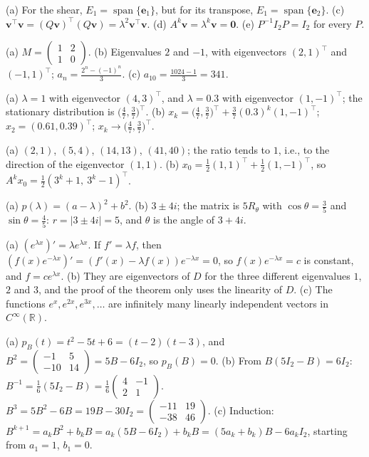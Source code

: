 \documentclass[11pt]{article}
\DeclareMathOperator{\Span}{span}
\begin{document}
\begin{description}[leftmargin=0pt, itemsep=0.3em]
    \item[\ref{pr:eig-props}.] (a) For the shear, $E_1 = \Span\{\mathbf{e}_1\}$, but for its transpose, $E_1 = \Span\{\mathbf{e}_2\}$. (c) $\mathbf{v}^\top \mathbf{v} = (Q\mathbf{v})^\top(Q\mathbf{v}) = \lambda^2 \mathbf{v}^\top \mathbf{v}$. (d) $A^k \mathbf{v} = \lambda^k \mathbf{v} = \mathbf{0}$. (e) $P^{-1} I_2 P = I_2$ for every $P$.
    \item[\ref{pr:eig-recurrence}.] (a) $M = \begin{pmatrix} 1 & 2 \\ 1 & 0 \end{pmatrix}$. (b) Eigenvalues $2$ and $-1$, with eigenvectors $(2, 1)^\top$ and $(-1, 1)^\top$; $a_n = \frac{2^n - (-1)^n}{3}$. (c) $a_{10} = \frac{1024 - 1}{3} = 341$.
    \item[\ref{pr:eig-markov}.] (a) $\lambda = 1$ with eigenvector $(4, 3)^\top$, and $\lambda = 0.3$ with eigenvector $(1, -1)^\top$; the stationary distribution is $\big(\frac{4}{7}, \frac{3}{7}\big)^\top$. (b) $x_k = \big(\frac{4}{7}, \frac{3}{7}\big)^\top + \frac{3}{7}(0.3)^k (1, -1)^\top$; $x_2 = (0.61, 0.39)^\top$; $x_k \to \big(\frac{4}{7}, \frac{3}{7}\big)^\top$.
    \item[\ref{pr:eig-power}.] (a) $(2, 1)$, $(5, 4)$, $(14, 13)$, $(41, 40)$; the ratio tends to $1$, i.e., to the direction of the eigenvector $(1, 1)$. (b) $x_0 = \frac{1}{2}(1, 1)^\top + \frac{1}{2}(1, -1)^\top$, so $A^k x_0 = \frac{1}{2}(3^k + 1, \ 3^k - 1)^\top$.
    \item[\ref{pr:eig-complex}.] (a) $p(\lambda) = (a - \lambda)^2 + b^2$. (b) $3 \pm 4i$; the matrix is $5 R_\theta$ with $\cos\theta = \frac{3}{5}$ and $\sin\theta = \frac{4}{5}$: $r = |3 \pm 4i| = 5$, and $\theta$ is the angle of $3 + 4i$.
    \item[\ref{pr:exp-eigen}.] (a) $(e^{\lambda x})' = \lambda e^{\lambda x}$. If $f' = \lambda f$, then $(f(x)e^{-\lambda x})' = (f'(x) - \lambda f(x))e^{-\lambda x} = 0$, so $f(x)e^{-\lambda x} = c$ is constant, and $f = ce^{\lambda x}$. (b) They are eigenvectors of $D$ for the three different eigenvalues $1$, $2$ and $3$, and the proof of the theorem only uses the linearity of $D$. (c) The functions $e^x, e^{2x}, e^{3x}, \ldots$ are infinitely many linearly independent vectors in $C^\infty(\mathbb{R})$.
    \item[\ref{pr:cayley-hamilton}.] (a) $p_B(t) = t^2 - 5t + 6 = (t - 2)(t - 3)$, and $B^2 = \begin{pmatrix} -1 & 5 \\ -10 & 14 \end{pmatrix} = 5B - 6I_2$, so $p_B(B) = 0$. (b) From $B(5I_2 - B) = 6I_2$: $B^{-1} = \frac{1}{6}(5I_2 - B) = \frac{1}{6}\begin{pmatrix} 4 & -1 \\ 2 & 1 \end{pmatrix}$. $B^3 = 5B^2 - 6B = 19B - 30I_2 = \begin{pmatrix} -11 & 19 \\ -38 & 46 \end{pmatrix}$. (c) Induction: $B^{k+1} = a_kB^2 + b_kB = a_k(5B - 6I_2) + b_kB = (5a_k + b_k)B - 6a_kI_2$, starting from $a_1 = 1$, $b_1 = 0$.

\end{description}
\end{document}
